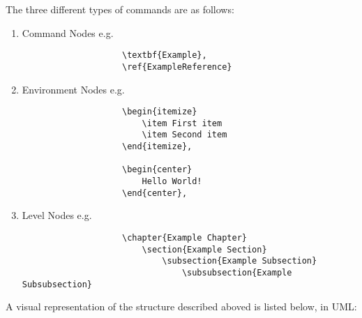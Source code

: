 		The three different types of commands are as follows:
		\begin{enumerate}
			\item Command Nodes e.g.
				\begin{verbatim}
					\textbf{Example},
					\ref{ExampleReference} 
				\end{verbatim}
			
			\item Environment Nodes e.g.
				\begin{verbatim}
					\begin{itemize} 
						\item First item 
						\item Second item
					\end{itemize},
					
					\begin{center}
						Hello World!
					\end{center},
				\end{verbatim}
			
			\item Level Nodes e.g.
				\begin{verbatim}
					\chapter{Example Chapter}
						\section{Example Section}
							\subsection{Example Subsection}
								\subsubsection{Example Subsubsection}
				\end{verbatim}
		\end{enumerate}
		
		A visual representation of the structure described aboved is listed below, in UML:
		